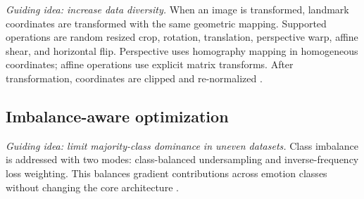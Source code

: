 \textit{Guiding idea: increase data diversity.}
When an image is transformed, landmark coordinates are transformed with the same geometric mapping.
Supported operations are random resized crop, rotation, translation, perspective warp, affine shear, and horizontal flip.
Perspective uses homography mapping in homogeneous coordinates; affine operations use explicit matrix transforms.
After transformation, coordinates are clipped and re-normalized \cite{shorten2019augmentation,buslaev2020albumentations}.

\subsection{Imbalance-aware optimization}

\textit{Guiding idea: limit majority-class dominance in uneven datasets.}
Class imbalance is addressed with two modes: class-balanced undersampling and inverse-frequency loss weighting.
This balances gradient contributions across emotion classes without changing the core architecture \cite{fernando2021dwb}.
